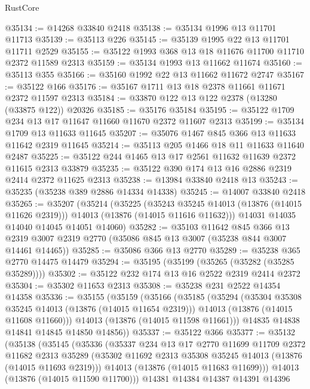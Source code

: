 \begin{lexlean}{RustCore}
\begin{coremodule}
@35134 := @14268 @33840 @2418
@35138 := @35134 @1996 @13 @11701 @11713
@35139 := @35113 @226
@35145 := @35139 @1995 @22 @13 @11701 @11711 @2529
@35155 := @35122 @1993 @368 @13 @18 @11676 @11700 @11710 @2372 @11589 @2313
@35159 := @35134 @1993 @13 @11662 @11674
@35160 := @35113 @355
@35166 := @35160 @1992 @22 @13 @11662 @11672 @2747
@35167 := @35122 @166
@35176 := @35167 @1711 @13 @18 @2378 @11661 @11671 @2372 @11597 @2313
@35184 := @33870 @122 @13 @122 @2378 (@13280 (@33875 @122)) @20326
@35185 := @35176 @35184
@35195 := @35122 @1709 @234 @13 @17 @11647 @11660 @11670 @2372 @11607 @2313
@35199 := @35134 @1709 @13 @11633 @11645
@35207 := @35076 @1467 @845 @366 @13 @11633 @11642 @2319 @11645
@35214 := @35113 @205 @1466 @18 @11 @11633 @11640 @2487
@35225 := @35122 @244 @1465 @13 @17 @2561 @11632 @11639 @2372 @11615 @2313 @33879
@35235 := @35122 @390 @174 @13 @16 @2886 @2319 @2414 @2372 @11625 @2313
@35238 := @13984 @33840 @2418 @13
@35243 := @35235 (@35238 @389 @2886 @14334 @14338)
@35245 := @14007 @33840 @2418
@35265 := @35207
    (@35214
      (@35225
        (@35243 @35245 @14013 (@13876 (@14015 @11626 @2319)))
        @14013
        (@13876 (@14015 @11616 @11632)))
      @14031
      @14035
      @14040
      @14045
      @14051
      @14060)
@35282 := @35103
    @11642
    @845
    @366
    @13
    @2319
    @3007
    @2319
    @2770
    (@35086 @845 @13 @3007 (@35238 @844 @3007 @14461 @14465))
@35285 := @35086 @366 @13 @2770
@35289 := @35238 @365 @2770 @14475 @14479
@35294 := @35195 (@35199 (@35265 (@35282 (@35285 @35289))))
@35302 := @35122 @232 @174 @13 @16 @2522 @2319 @2414 @2372
@35304 := @35302 @11653 @2313
@35308 := @35238 @231 @2522 @14354 @14358
@35336 := @35155
    (@35159
      (@35166
        (@35185
          (@35294
            (@35304 @35308 @35245 @14013 (@13876 (@14015 @11654 @2319)))
            @14013
            (@13876 (@14015 @11608 @11660)))
          @14013
          (@13876 (@14015 @11598 @11661)))
        @14835
        @14838
        @14841
        @14845
        @14850
        @14856))
@35337 := @35122 @366
@35377 := @35132
    (@35138
      (@35145
        (@35336
          (@35337
            @234
            @13
            @17
            @2770
            @11699
            @11709
            @2372
            @11682
            @2313
            @35289
            (@35302 @11692 @2313 @35308 @35245 @14013 (@13876 (@14015 @11693 @2319)))
            @14013
            (@13876 (@14015 @11683 @11699)))
          @14013
          (@13876 (@14015 @11590 @11700)))
        @14381
        @14384
        @14387
        @14391
        @14396

\end{coremodule}
\end{lexlean}
